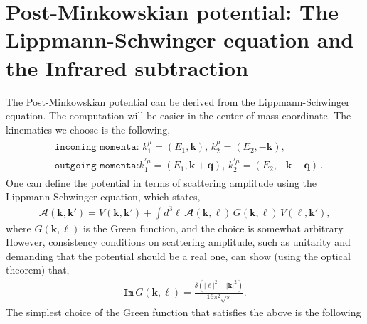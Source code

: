 \section{Post-Minkowskian potential: The Lippmann-Schwinger equation and the Infrared subtraction} \label{ch4:sec4}   
The Post-Minkowskian potential can be derived from the Lippmann-Schwinger equation. The computation will be easier in the center-of-mass coordinate. The kinematics we choose is the following,
\begin{align}
\begin{split}
&   \texttt{incoming momenta:}\,\, k_1^\mu=(E_1,\boldsymbol{k}),\,k_2^\mu=(E_2,-\boldsymbol{k}),\\ &
\texttt{outgoing momenta:} k_1^{'\mu}=(E_1,\boldsymbol{k+q}), \,k_2^{'\mu}=(E_2,\boldsymbol{-k-q})\,.
\end{split}
\end{align}
One can define the potential in terms of scattering amplitude using the Lippmann-Schwinger equation, which states,
\begin{align}
    \mathbfcal{A}(\boldsymbol{k},\boldsymbol{k'})=V(\boldsymbol{k},\boldsymbol{k'})+\int d^3\boldsymbol{\ell} \,\mathbfcal{A}(\boldsymbol{k},\boldsymbol{\ell}) \,G(\boldsymbol{k},\boldsymbol{\ell})\,V(\boldsymbol{\ell},\boldsymbol{k'}),\label{4.2f}
\end{align}
where $G(\boldsymbol{k},\boldsymbol{\ell})$ is the Green function, and the choice is somewhat arbitrary. However, consistency conditions on scattering amplitude, such as unitarity and demanding that the potential should be a real one, can show (using the optical theorem) that,
\begin{align}
\texttt{Im}\,G(\boldsymbol{k},\boldsymbol{\ell})=\frac{\delta(|\boldsymbol{\ell}|^2-|\boldsymbol{k}|^2)}{16\pi^2 \sqrt{s}}.
\end{align}
The simplest choice of the Green function that satisfies the above is the following 

